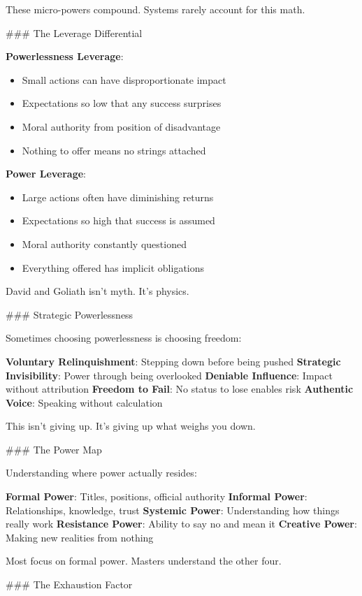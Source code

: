 \documentclass[12pt]{book}
\begin{document}
These micro-powers compound. Systems rarely account for this math.

\#\#\# The Leverage Differential

\textbf{Powerlessness Leverage}:
\begin{itemize}
\item Small actions can have disproportionate impact
\item Expectations so low that any success surprises
\item Moral authority from position of disadvantage
\item Nothing to offer means no strings attached

\end{itemize}
\textbf{Power Leverage}:
\begin{itemize}
\item Large actions often have diminishing returns
\item Expectations so high that success is assumed
\item Moral authority constantly questioned
\item Everything offered has implicit obligations

\end{itemize}
David and Goliath isn't myth. It's physics.

\#\#\# Strategic Powerlessness

Sometimes choosing powerlessness is choosing freedom:

\textbf{Voluntary Relinquishment}: Stepping down before being pushed
\textbf{Strategic Invisibility}: Power through being overlooked
\textbf{Deniable Influence}: Impact without attribution
\textbf{Freedom to Fail}: No status to lose enables risk
\textbf{Authentic Voice}: Speaking without calculation

This isn't giving up. It's giving up what weighs you down.

\#\#\# The Power Map

Understanding where power actually resides:

\textbf{Formal Power}: Titles, positions, official authority
\textbf{Informal Power}: Relationships, knowledge, trust
\textbf{Systemic Power}: Understanding how things really work
\textbf{Resistance Power}: Ability to say no and mean it
\textbf{Creative Power}: Making new realities from nothing

Most focus on formal power. Masters understand the other four.

\#\#\# The Exhaustion Factor
\end{document}
